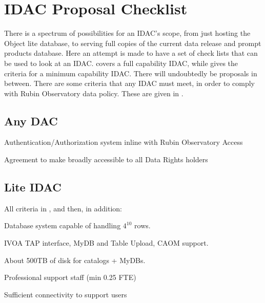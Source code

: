
\section{IDAC Proposal Checklist}\label{sec:checklist}

There is a spectrum of possibilities for an IDAC's scope, from just hosting the Object lite database, to serving full copies of the current data release and prompt products database.
Here an attempt is made to have a set of check lists  that can be used to look at an IDAC.
 covers a full capability IDAC, while   gives the criteria for a minimum capability IDAC.
There will undoubtedly be proposals in between. There are some criteria that any IDAC must meet, in order to comply with Rubin Observatory data policy. These are given in .

\subsection{Any DAC} \label{sec:anyDAC}
\begin{todolist}
\item Authentication/Authorization system  inline with Rubin Observatory Access
\item Agreement to make broadly accessible to all Data Rights holders
\end{todolist}

\subsection{Lite IDAC} \label{sec:liteDAC}
All criteria in , and then, in addition:
\begin{todolist}
\item Database system capable of handling $4^{10}$ rows.
\item IVOA TAP interface, MyDB and Table Upload, CAOM support.
\item About 500TB of disk for catalogs + MyDBs.
\item Professional support staff (min 0.25 FTE)
\item Sufficient connectivity to support users
\end{todolist}

